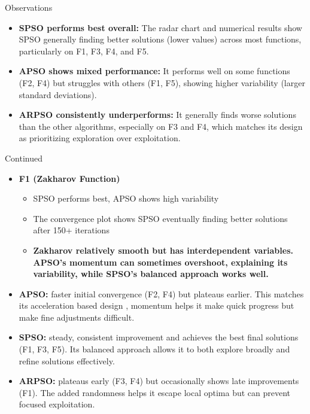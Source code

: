 \documentclass[aspectratio=169]{beamer}
\begin{document}
\begin{frame}{Observations}
    \begin{itemize}
        \item \textbf{SPSO performs best overall:} The radar chart and numerical results show SPSO generally finding better solutions (lower values) across most functions, particularly on F1, F3, F4, and F5.
        \item \textbf{APSO shows mixed performance:} It performs well on some functions (F2, F4) but struggles with others (F1, F5), showing higher variability (larger standard deviations).
        \item \textbf{ARPSO consistently underperforms:} It generally finds worse solutions than the other algorithms, especially on F3 and F4, which matches its design as prioritizing exploration over exploitation.
    \end{itemize}
\end{frame}
\begin{frame}{Continued}
    \begin{itemize}
        \item \textbf{F1 (Zakharov Function)}
        \begin{itemize}
            \item SPSO performs best, APSO shows high variability
            \item The convergence plot shows SPSO eventually finding better solutions after 150+ iterations
            \item \textbf{Zakharov relatively smooth but has interdependent variables. APSO's momentum can sometimes overshoot, explaining its variability, while SPSO's balanced approach works well.}
        \end{itemize}
        \item \textbf{APSO:} faster initial convergence (F2, F4) but plateaus earlier. This matches its acceleration based design , momentum helps it make quick progress but make fine adjustments difficult.
        \item \textbf{SPSO:} steady, consistent improvement and achieves the best final solutions (F1, F3, F5). Its balanced approach allows it to both explore broadly and refine solutions effectively.
        \item \textbf{ARPSO:} plateaus early (F3, F4) but occasionally shows late improvements (F1). The added randomness helps it escape local optima but can prevent focused exploitation.
    \end{itemize}
\end{frame}
\end{document}
